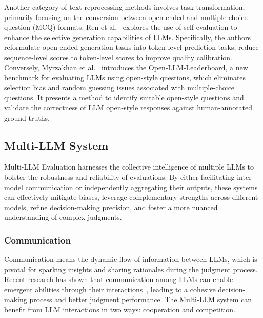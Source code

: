 Another category of text reprocessing methods involves task transformation, primarily focusing on the conversion between open-ended and multiple-choice question (MCQ) formats. Ren et al.~\cite{ren2023self} explores the use of self-evaluation to enhance the selective generation capabilities of LLMs. Specifically, the authors reformulate open-ended generation tasks into token-level prediction tasks, reduce sequence-level scores to token-level scores to improve quality calibration.
Conversely, Myrzakhan et al.~\cite{myrzakhan2024open} introduces the Open-LLM-Leaderboard, a new benchmark for evaluating LLMs using open-style questions, which eliminates selection bias and random guessing issues associated with multiple-choice questions. It presents a method to identify suitable open-style questions and validate the correctness of LLM open-style responses against human-annotated ground-truths.


\subsection{Multi-LLM System}
\label{sec:Multi-LLM System}

\par Multi-LLM Evaluation harnesses the collective intelligence of multiple LLMs to bolster the robustness and reliability of evaluations. By either facilitating inter-model communication or independently aggregating their outputs, these systems can effectively mitigate biases, leverage complementary strengths across different models, refine decision-making precision, and foster a more nuanced understanding of complex judgments.



\subsubsection{Communication}
\label{sec:Communication}
\par Communication means the dynamic flow of information between LLMs, which is pivotal for sparking insights and sharing rationales during the judgment process. 
Recent research has shown that communication among LLMs can enable emergent abilities through their  interactions~\cite{xu2023towards}, leading to a cohesive decision-making process and better judgment performance.
The Multi-LLM system can benefit from LLM interactions in two ways: cooperation and competition.


